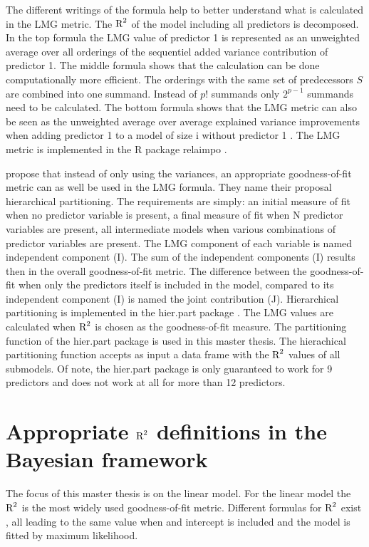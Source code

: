 \documentclass[11pt,a4paper,twoside]{book}\usepackage[]{graphicx}\usepackage[]{color}
\begin{document}
   The different writings of the formula help to better understand what is calculated in the LMG metric. The $\text{R}^2$ of the model including all predictors is decomposed. In the top formula the LMG value of predictor 1 is represented as an unweighted average over all orderings of the sequentiel added variance contribution of predictor 1. The middle formula shows that the calculation can be  done computationally more efficient. The orderings with the same set of predecessors $S$ are combined into one summand. Instead of $p!$ summands only $2^{p-1}$ summands need to be calculated. The bottom formula shows that the LMG metric can also be seen as the unweighted average over average explained variance improvements when adding predictor 1 to a model of size i without predictor 1 \citep{Gromping2015}. The LMG metric is implemented in the R package relaimpo \citep{Gromping2006}.
   
\cite{Chevan1991} propose that instead of only using the variances, an appropriate goodness-of-fit metric can as well be used in the LMG formula. They name their proposal hierarchical partitioning. The requirements are simply: an initial measure of fit when no predictor variable is present, a final measure of fit when N predictor variables are present, all intermediate models when various combinations of predictor variables are present. 
  The LMG component of each variable is named independent component (I). The sum of the independent components (I) results then in the overall goodness-of-fit metric. The difference between the goodness-of-fit when only the predictors itself is included in the model, compared to its independent component (I) is named the joint contribution (J). Hierarchical partitioning is implemented in the hier.part package \citep{Walsh2015}. The LMG values are calculated when  $\text{R}^2$ is chosen as the goodness-of-fit measure.  The partitioning function of the hier.part package is used in this master thesis. The hierachical partitioning function accepts as input a data frame with the $\text{R}^2$ values of all submodels. Of note,  the hier.part package is only guaranteed to work for 9 predictors and does not work at all for more than 12 predictors.
  
\section{ Appropriate $\text{R}^2$ definitions in the Bayesian framework}
The focus of this master thesis is on the linear model. For the linear model the $\text{R}^2$ is the most widely used goodness-of-fit metric.  Different formulas for $\text{R}^2$ exist \cite{Kvalseth1985}, all leading to the same value when and intercept is included and the model is fitted by maximum likelihood. 
\end{document}
